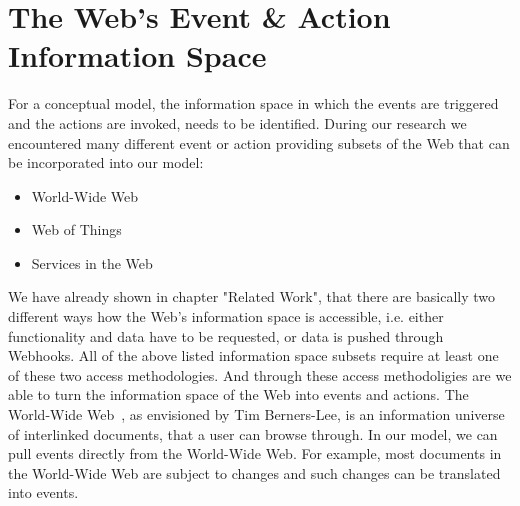 \section{The Web's Event \& Action Information Space}


For a conceptual model, the information space in which the events are triggered and the actions are invoked, needs to be identified.
During our research we encountered many different event or action providing subsets of the Web that can be incorporated into our model:
\begin{itemize}
  \item \textrm{World-Wide Web}
  \item \textrm{Web of Things}
  \item Services in the Web
\end{itemize}
We have already shown in chapter "Related Work", that there are basically two different ways how the Web's information space is accessible, i.e. either functionality and data have to be requested, or data is pushed through Webhooks.
All of the above listed information space subsets require at least one of these two access methodologies.
And through these access methodoligies are we able to turn the information space of the Web into events and actions.
The \textrm{World-Wide Web}~\cite{DBLP:journals/en/Berners-LeeCGP92}, as envisioned by Tim Berners-Lee, is an information universe of interlinked documents, that a user can browse through.
In our model, we can pull events directly from the World-Wide Web.
For example, most documents in the World-Wide Web are subject to changes and such changes can be translated into events.

